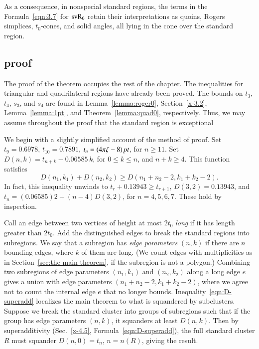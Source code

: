 As a consequence, in nonspecial standard regions, the terms in the
Formula~\ref{eqn:3.7} for ${\operatorname{svR}}_0$ retain their interpretations as
quoins, Rogers simplices, $t_0$-cones, and solid angles, all lying
in the cone over the standard region.


\subsection{proof} %

The proof of the theorem occupies the rest of the chapter. The
inequalities for triangular and quadrilateral regions have already
been proved. The bounds on $t_3$, $t_4$, $s_3$, and $s_4$ are
found in Lemma~\ref{lemma:roger0}, Section~\ref{x-3.2},
Lemma~\ref{lemma:1pt}, and Theorem~\ref{lemma:quad0},
respectively. Thus, we may assume throughout the proof that the
standard region is exceptional

We begin with a slightly simplified account of the method of
proof. Set $t_9=0.6978$, $t_{10}= 0.7891$, $t_n=(4\pi\zeta-8)\,\hbox{\it pt}$, for
$n\ge 11$. Set $D(n,k) = t_{n+k} - 0.06585\,k$, for $0\le k\le n$,
and $n+k\ge 4$. This function satisfies
    \begin{equation}
    D(n_1,k_1)+D(n_2,k_2)\ge D(n_1+n_2-2,k_1+k_2-2).
    \label{eqn:D-superadd}
    \end{equation}
In fact, this inequality unwinds to $t_r+0.13943\ge t_{r+1}$,
$D(3,2)=0.13943$, and $t_n =(0.06585)2+(n-4)D(3,2)$, for $n=4,5,6,7$.
These hold  by inspection.

Call an edge between two vertices of height at most $2t_0$ {\it long\/}
if it has length greater than $2t_0$. Add the distinguished edges to
break the standard regions into subregions. We say that a subregion has
{\it edge parameters} $(n,k)$ if there are $n$ bounding edges, where $k$
of them are long. (We count edges with multiplicities as in
Section~\ref{sec:the-main-theorem}, if the subregion is not a polygon.)
Combining two subregions of edge parameters $(n_1,k_1)$ and $(n_2,k_2)$
along a long edge $e$ gives a union with edge parameters
$(n_1+n_2-2,k_1+k_2-2)$, where we agree not to count the internal edge
$e$ that no longer bounds. Inequality~\ref{eqn:D-superadd} localizes the
main theorem to what is squandered by subclusters. Suppose we break the
standard cluster into groups of subregions such that if the group has
edge parameters $(n,k)$, it squanders at least $D(n,k)$. Then by
superadditivity (Sec.~\ref{x-4.5}, Formula~\ref{eqn:D-superadd}), the
full standard cluster $R$ must squander $D(n,0) = t_n$, $n=n(R)$, giving
the result.

